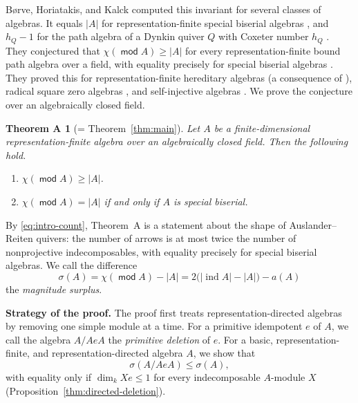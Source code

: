 \documentclass[a4paper,reqno,10pt]{amsart}
\newtheorem*{theoremA}{Theorem A}
\theoremstyle{definition}
\numberwithin{equation}{section}
\DeclareMathOperator{\moduleCategory}{\mathsf{mod}}
\renewcommand{\mod}{\moduleCategory}
\DeclareMathOperator{\ind}{ind}
\begin{document}
B{\o}rve, Horiatakis, and Kalck computed this invariant for several classes
of algebras. It equals \(|A|\) for representation-finite special biserial
algebras \cite[Theorem~3.5]{BHK}, and \(h_Q-1\) for the path algebra of a
Dynkin quiver \(Q\) with Coxeter number \(h_Q\) \cite[Theorem~4.3]{BHK}.
They conjectured that \(\chi(\mod A)\geq|A|\) for every
representation-finite bound path algebra over a field, with equality
precisely for special biserial algebras \cite[Conjecture~A]{BHK}. They
proved this for representation-finite hereditary algebras (a consequence
of \cite[Theorem~4.3]{BHK}), radical square zero algebras
\cite[Corollary~4.6]{BHK}, and self-injective algebras
\cite[Theorem~5.8 and Corollary~5.9]{BHK}. We prove the conjecture over an
algebraically closed field.

\begin{theoremA}[= Theorem~\ref{thm:main}]\label{thm:intro-main}
Let \(A\) be a finite-dimensional representation-finite algebra over an
algebraically closed field. Then the following hold.
\begin{enumerate}
\item \(\chi(\mod A)\geq |A|\).
\item \(\chi(\mod A)=|A|\) if and only if \(A\) is special biserial.
\end{enumerate}
\end{theoremA}

By \eqref{eq:intro-count}, Theorem~A is a statement about the shape of
Auslander--Reiten quivers: the number of arrows is at most twice the
number of nonprojective indecomposables, with equality precisely for
special biserial algebras. We call the difference
\[
 \sigma(A)=\chi(\mod A)-|A|=2\bigl(|\ind A|-|A|\bigr)-a(A)
\]
the \emph{magnitude surplus}.

\medskip\noindent\textbf{Strategy of the proof.}
The proof first treats representation-directed algebras by removing one
simple module at a time. For a primitive idempotent \(e\) of \(A\), we
call the algebra \(A/AeA\) the \emph{primitive deletion} of \(e\). For a basic, representation-finite, and representation-directed
algebra \(A\), we show that
\[
 \sigma(A/AeA)\leq\sigma(A),
\]
with equality only if \(\dim_k Xe\leq1\) for every indecomposable
\(A\)-module \(X\) (Proposition~\ref{thm:directed-deletion}).
\end{document}
